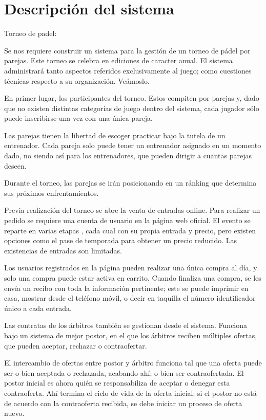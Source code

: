 \section{Descripción del sistema}
Torneo de padel:

Se nos requiere construir un sistema para la gestión de un torneo de pádel por parejas. Este torneo se celebra en ediciones de caracter anual. El sistema administrará tanto aspectos referidos exclusivamente al juego; como cuestiones técnicas respecto a su organización. Veámoslo.


En primer lugar, los participantes del torneo. Estos compiten por parejas y, dado que no existen distintas categorías de juego dentro del sistema, cada jugador sólo puede inscribirse una vez con una única pareja.

Las parejas tienen la libertad de escoger practicar bajo la tutela de un entrenador. Cada pareja solo puede tener un entrenador asignado en un momento dado, no siendo así para los entrenadores, que pueden dirigir a cuantas parejas deseen. 

Durante el torneo, las parejas se irán posicionando en un ránking que determina sus próximos enfrentamientos.


Previa realización del torneo se abre la venta de entradas online. Para realizar un pedido se requiere una cuenta de usuario en la página web oficial. El evento se reparte en varias etapas , cada cual con su propia entrada y precio, pero existen opciones como el pase de temporada para obtener un precio reducido. Las existencias de entradas son limitadas.

Los usuarios registrados en la página pueden realizar una única compra al día, y solo una compra puede estar activa en carrito. Cuando finaliza una compra, se les envía un recibo con toda la información pertinente; este se puede imprimir en casa, mostrar desde el teléfono móvil, o decir en taquilla el número identificador único a cada entrada.


Las contratas de los árbitros también se gestionan desde el sistema. Funciona bajo un sistema de mejor postor, en el que los árbitros reciben múltiples ofertas, que pueden aceptar, rechazar o contraofertar. 

El intercambio de ofertas entre postor y árbitro funciona tal que una oferta puede ser o bien aceptada o rechazada, acabando ahí; o bien ser contraofertada. El postor inicial es ahora quién se responsabiliza de aceptar o denegar esta contraoferta. Ahí termina el ciclo de vida de la oferta inicial: si el postor no está de acuerdo con la contraoferta recibida, se debe iniciar un proceso de oferta nuevo. 

